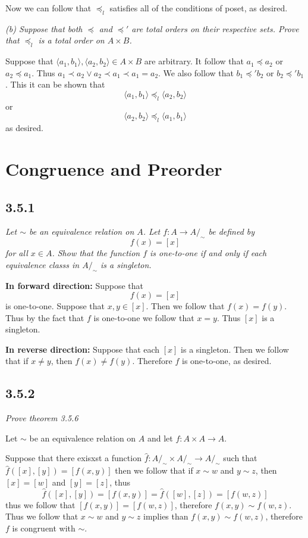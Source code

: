 \documentclass[11pt,oneside,titlepage]{book}
\newcommand{\eangle}[1]{\langle #1 \rangle}
\begin{document}
Now we can follow that $\preceq_l$ satisfies all of the conditions of poset, as desired.

\textit{(b) Suppose that both $\preceq$ and $\preceq'$ are total orders on their respective sets.
  Prove that $\preceq_l$ is a total order on $A \times B$.}

Suppose that $\eangle{a_1, b_1}, \eangle{a_2, b_2}  \in A \times B$ are arbitrary. It follow that
$a_1 \preceq a_2$ or $a_2 \preceq a_1$. Thus $a_1 \prec a_2 \lor a_2 \prec a_1 \prec a_1 = a_2$.
We also follow that $b_1 \preceq' b_2$ or $b_2 \preceq' b_1$. This it can be shown that
$$\eangle{a_1, b_1} \preceq_l \eangle{a_2, b_2}$$
or
$$\eangle{a_2, b_2} \preceq_l \eangle{a_1, b_1}$$
as desired.

\section{Congruence and Preorder}

\subsection*{3.5.1}

\textit{Let $\sim$ be an equivalence relation on $A$. Let $f: A \to A/_\sim$ be defined by
  $$f(x) = [x]$$
  for all $x \in A$. Show that the function $f$ is one-to-one if and only if each equivalence
  classs in $A/_\sim$ is a singleton.}

\textbf{In forward direction: }
Suppose that
$$f(x) = [x]$$
is one-to-one. Suppose that $x, y \in [x]$. Then we follow that $f(x) = f(y)$. Thus by the fact
that $f$ is one-to-one we follow that $x = y$. Thus $[x]$ is a singleton.

\textbf{In reverse direction: }
Suppose that each $[x]$ is a singleton. Then we follow that if $x \neq y$, then $f(x) \neq f(y)$.
Therefore $f$ is one-to-one, as desired.

\subsection*{3.5.2}

\textit{Prove theorem 3.5.6}

Let $\sim$ be an equivalence relation on $A$ and let $f: A \times A \to A$.

Suppose that there exisxst a function $\hat{f}: A/_\sim \times A/_\sim \to A/_\sim$ such that
$\hat{f}([x], [y]) = [f(x, y)]$
then we follow that if $x \sim w$ and $y \sim z$, then $[x] = [w]$ and $[y] = [z]$, thus
$$\hat{f}([x], [y]) = [f(x, y)] = \hat{f}([w], [z]) = [f(w, z)]$$
thus we follow that $[f(x, y)] = [f(w, z)]$, therefore $f(x, y) \sim f(w, z)$.
Thus we follow that $x \sim w$ and $y \sim z$ implies than $f(x, y) \sim f(w, z)$, therefore
$f$ is congruent with $\sim$.
\end{document}
